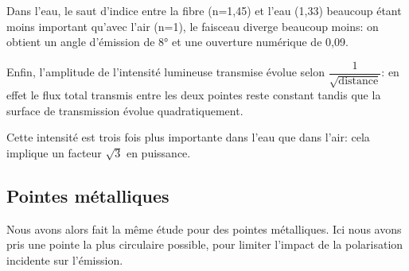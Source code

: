 Dans l'eau, le saut d'indice entre la fibre (n=1,45) et l'eau (1,33) beaucoup étant moins important qu'avec l'air (n=1), le faisceau diverge beaucoup moins: on obtient un angle d'émission de $8\si{\degree}$ et une ouverture numérique de 0,09.

Enfin, l'amplitude de l'intensité lumineuse transmise évolue selon $\dfrac{1}{\sqrt{\text{distance}}}$: en effet le flux total transmis entre les deux pointes reste constant tandis que la surface de transmission évolue quadratiquement.

Cette intensité est trois fois plus importante dans l'eau que dans l'air: cela implique un facteur $\sqrt{3}$ en puissance.


\subsection{Pointes métalliques}
Nous avons alors fait la même étude pour des pointes métalliques. Ici nous avons pris une pointe la plus circulaire possible, pour limiter l'impact de la polarisation incidente sur l'émission.


